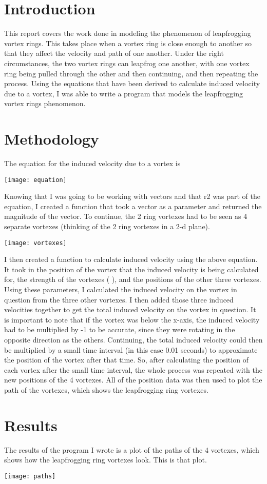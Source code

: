 \documentclass{article}
\begin{document}
\section{Introduction}
This report covers the work done in modeling the phenomenon of leapfrogging vortex rings. This takes place when a vortex ring is close enough to another so that they affect the velocity and path of one another. Under the right circumstances, the two vortex rings can leapfrog one another, with one vortex ring being pulled through the other and then continuing, and then repeating the process. Using the equations that have been derived to calculate induced velocity due to a vortex, I was able to write a program that models the leapfrogging vortex rings phenomenon. 

\section{Methodology}
The equation for the induced velocity due to a vortex is

\begin{center}
\texttt{[image: equation]}
\end{center}

Knowing that I was going to be working with vectors and that r2 was part of the equation, I created a function that took a vector as a parameter and returned the magnitude of the vector. To continue, the 2 ring vortexes had to be seen as 4 separate vortexes (thinking of the 2 ring vortexes in a 2-d plane).

\begin{center}
\texttt{[image: vortexes]}
\end{center}

I then created a function to calculate induced velocity using the above equation. It took in the position of the vortex that the induced velocity is being calculated for, the strength of the vortexes ( ), and the positions of the other three vortexes. Using these parameters, I calculated the induced velocity on the vortex in question from the three other vortexes. I then added those three induced velocities together to get the total induced velocity on the vortex in question. It is important to note that if the vortex was below the x-axis, the induced velocity had to be multiplied by -1 to be accurate, since they were rotating in the opposite direction as the others. Continuing, the total induced velocity could then be multiplied by a small time interval (in this case 0.01 seconds) to approximate the position of the vortex after that time. So, after calculating the position of each vortex after the small time interval, the whole process was repeated with the new positions of the 4 vortexes. All of the position data was then used to plot the path of the vortexes, which shows the leapfrogging ring vortexes. 

\section{Results}
The results of the program I wrote is a plot of the paths of the 4 vortexes, which shows how the leapfrogging ring vortexes look. This is that plot.

\begin{center}
\texttt{[image: paths]}
\end{center}
\end{document}
